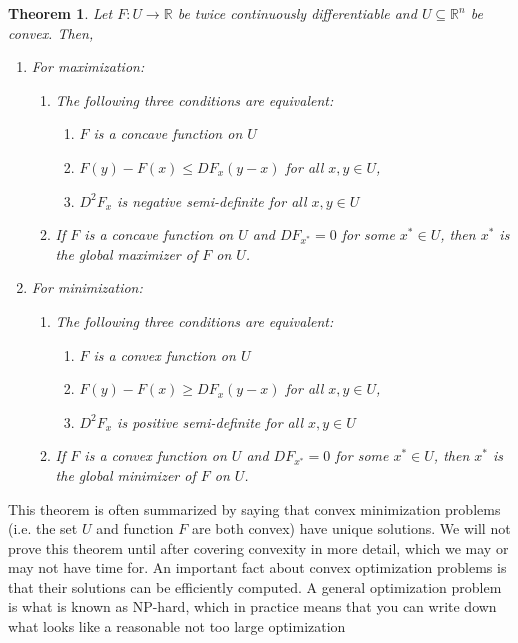 \documentclass[12pt,reqno]{amsart}
\newtheorem{theorem}{Theorem}[section]
\theoremstyle{definition}
\def\R{\mathbb{R}}
\renewcommand{\to}{{\rightarrow}}
\begin{document}
\begin{theorem}
  Let $F: U \to \R$ be twice continuously differentiable and $U
  \subseteq \R^n$ be convex. Then,
  \begin{enumerate}
  \item For maximization:
    \begin{enumerate}
    \item The following three conditions are equivalent:
      \begin{enumerate}
      \item $F$ is a concave function on $U$
      \item $F(y) - F(x) \leq DF_x(y-x)$ for all $x,y \in U$,
      \item $D^2 F_x$ is negative semi-definite for all $x, y \in U$
      \end{enumerate}
    \item If $F$ is a concave function on $U$ and $DF_{x^*} = 0$ for
      some $x^* \in U$, then
      $x^*$ is the global maximizer of $F$ on $U$.
    \end{enumerate}
  \item For minimization:
    \begin{enumerate}
    \item The following three conditions are equivalent:
      \begin{enumerate}
      \item $F$ is a convex function on $U$
      \item $F(y) - F(x) \geq DF_x(y-x)$ for all $x,y \in U$,
      \item $D^2 F_x$ is positive semi-definite for all $x, y \in U$
      \end{enumerate}
    \item If $F$ is a convex function on $U$ and $DF_{x^*} = 0$ for
      some $x^* \in U$, then
      $x^*$ is the global minimizer of $F$ on $U$.
    \end{enumerate}
  \end{enumerate}
\end{theorem}
This theorem is often summarized by saying that convex minimization
problems (i.e. the set $U$ and function $F$ are both convex) have
unique solutions.  We will not prove this theorem until after covering
convexity in more detail, which we may or may not have time for.  
An important fact about convex optimization problems is that their
solutions can be efficiently computed. A general optimization problem
is what is known as NP-hard, which in practice means that you can
write down what looks like a reasonable not too large optimization
\end{document}
